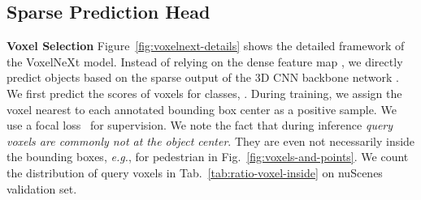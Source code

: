 \documentclass[10pt,twocolumn,letterpaper]{article}
\begin{document}
{\subsection{Sparse Prediction Head}
\label{sec:sparse-prediction-head}

\noindent
\textbf{Voxel Selection}
Figure~\ref{fig:voxelnext-details} shows the detailed framework of the VoxelNeXt model. Instead of relying on the dense feature map , we directly predict objects based on the sparse output of the 3D CNN backbone network . We first predict the scores of voxels for  classes, . During training, we assign the voxel nearest to each annotated bounding box center as a positive sample. We use a focal loss~\cite{focalloss} for supervision. 
We note the fact that during inference {\em query voxels are commonly not at the object center}.
They are even not necessarily inside the bounding boxes, {\em e.g.}, for pedestrian in Fig.~\ref{fig:voxels-and-points}. We count the distribution of query voxels in Tab.~\ref{tab:ratio-voxel-inside} on nuScenes validation set. 

}
\end{document}
